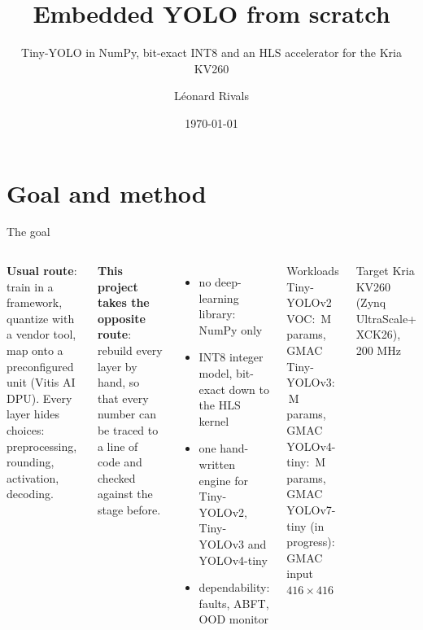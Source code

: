 \documentclass[aspectratio=169,11pt]{beamer}
\title{Embedded YOLO from scratch}
\subtitle{Tiny-YOLO in NumPy, bit-exact INT8 and an HLS accelerator for the Kria KV260}
\author{Léonard Rivals}
\date{\today}
\begin{document}
\maketitle

\section{Goal and method}

\begin{frame}{The goal}
  \footnotesize
  \begin{columns}[T]
    \textbf{Usual route}: train in a framework, quantize with a vendor tool, map onto a
    preconfigured unit (Vitis AI DPU). Every layer hides choices: preprocessing, rounding,
    activation, decoding.

    \medskip
    \textbf{This project takes the opposite route}: rebuild every layer by hand, so that
    every number can be traced to a line of code and checked against the stage before.
    \begin{itemize}
      \item no deep-learning library: NumPy only
      \item INT8 integer model, bit-exact down to the HLS kernel
      \item one hand-written engine for Tiny-YOLOv2, Tiny-YOLOv3 and YOLOv4-tiny
      \item dependability: faults, ABFT, OOD monitor
    \end{itemize}
    \begin{block}{Workloads}
      \small
      Tiny-YOLOv2 VOC: \,M params,  GMAC\\
      Tiny-YOLOv3: \,M params,  GMAC\\
      YOLOv4-tiny: \,M params,  GMAC\\
      YOLOv7-tiny (in progress):  GMAC\\
      input $416\times416$
    \end{block}
    \begin{block}{Target}
      \small Kria KV260 (Zynq UltraScale+ XCK26), 200 MHz
    \end{block}
  \end{columns}
\end{frame}
\end{document}
